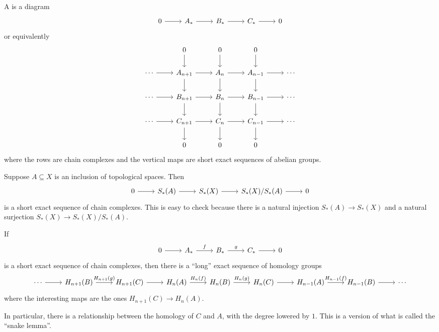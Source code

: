 \documentclass{standalone}
\begin{document}
\begin{definition}
  A  is a diagram
  \[
    \begin{tikzcd}
      0 \ar[r] &
      A_* \ar[r] &
      B_* \ar[r] &
      C_* \ar[r] &
      0
    \end{tikzcd}
  \]
  or equivalently
  \[
    \begin{tikzcd}
       &
      0 \ar[d] &
      0 \ar[d] &
      0 \ar[d] &
      \\
      \cdots \ar[r] &
      A_{n+1} \ar[r] \ar[d] &
      A_n     \ar[r] \ar[d] &
      A_{n-1} \ar[r] \ar[d] &
      \cdots \\
      \cdots \ar[r] &
      B_{n+1} \ar[r] \ar[d] &
      B_n     \ar[r] \ar[d] &
      B_{n-1} \ar[r] \ar[d] &
      \cdots \\
      \cdots  \ar[r] &
      C_{n+1} \ar[r] \ar[d] &
      C_n     \ar[r] \ar[d] &
      C_{n-1} \ar[r] \ar[d] &
      \cdots \\
      &
      0 &
      0 &
      0 &
    \end{tikzcd}
  \]
  where the rows are chain complexes and the vertical maps are
  short exact sequences of abelian groups.
\end{definition}

\begin{example}
  Suppose \(A \subseteq X\) is an inclusion of topological spaces. Then
  \[
    \begin{tikzcd}
      0 \ar[r] &
      S_*(A) \ar[r] &
      S_*(X) \ar[r] &
      S_*(X)/S_*(A) \ar[r] &
      0
    \end{tikzcd}
  \]
  is a short exact sequence of chain complexes.
  This is easy to check because there is a natural injection
  \(S_*(A) \to S_*(X)\) and a natural surjection \(S_*(X) \to S_*(X)/S_*(A)\).
\end{example}

\begin{theorem}
  If
  \[
    \begin{tikzcd}
      0 \ar[r] &
      A_* \ar[r, "f"] &
      B_* \ar[r, "g"] &
      C_* \ar[r] &
      0
    \end{tikzcd}
  \]
  is a short exact sequence of chain complexes, then there is
  a ``long'' exact sequence of homology groups
  \[
    \begin{tikzcd}
      \cdots \ar[r] &
      H_{n+1}(B) \ar[r, "H_{n+1}(g)"] &
      H_{n+1}(C) \ar[r] &
      H_n(A)     \ar[r, "H_{n}(f)"] &
      H_n(B)     \ar[r, "H_{n}(g)"] &
      H_n(C)     \ar[r] &
      H_{n-1}(A) \ar[r, "H_{n-1}(f)"] &
      H_{n-1}(B) \ar[r] &
      \cdots
    \end{tikzcd}
  \]
  where the interesting maps are the ones \(H_{n+1}(C) \to H_n(A)\).
\end{theorem}
In particular, there is a relationship between the homology of \(C\) and \(A\),
with the degree lowered by \(1\).
This is a version of what is called the ``snake lemma''.
\end{document}
